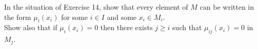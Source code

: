 \documentclass[a4paper]{exam}
\begin{document}
\begin{questions}

	\question In the situation of Exercise 14, show that every element of $M$ can be written in the form $\mu _i(x_i)$ for some $i\in I$ and some $x_i\in M_i$.\\
	Show also that if $\mu _i(x_i) = 0$ then there exists $j \ge i$ such that $\mu _{ij}(x_i) = 0$ in $M_j$.


\end{questions}
\end{document}
